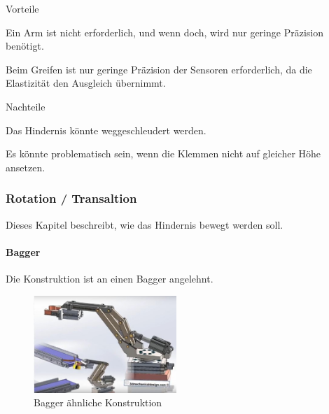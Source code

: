 \documentclass[../main.tex]{subfiles}
\begin{document}
\begin{minipage}[t]{0.48\textwidth}
    \begin{items}
          \item [Vorteile]
          \item Ein Arm ist nicht erforderlich, und wenn doch, wird nur geringe Präzision benötigt.
          \item Beim Greifen ist nur geringe Präzision der Sensoren erforderlich, da die Elastizität den Ausgleich übernimmt.
    \end{items}
\end{minipage}
\hfill
\begin{minipage}[t]{0.48\textwidth}
    \begin{items}
          \item [Nachteile]
          \item Das Hindernis könnte weggeschleudert werden.
          \item Es könnte problematisch sein, wenn die Klemmen nicht auf gleicher Höhe ansetzen.
    \end{items}
\end{minipage}
\newpage
\subsubsection{Rotation / Transaltion}
Dieses Kapitel beschreibt, wie das Hindernis bewegt werden soll.

\paragraph{Bagger}
Die Konstruktion ist an einen Bagger angelehnt.

\begin{figure}[h!]
        \centering
        \includegraphics[width=0.48\textwidth]{img/technologierecherche/Rotation/kran.jpg}
        \caption[Bagger ähnliche Konstruktion]{Bagger ähnliche Konstruktion \footnotemark} 
        \label{img:tech_kran}
\end{figure}
\end{document}
